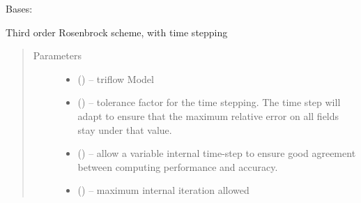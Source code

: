 \documentclass[letterpaper,10pt,english]{sphinxmanual}
\begin{document}
\begin{fulllineitems}
\begin{quote}
\begin{description}
\begin{itemize}
\end{itemize}

\end{description}\end{quote}

\end{fulllineitems}


\begin{fulllineitems}
\label{\detokenize{triflow.plugins:triflow.plugins.schemes.ROS3PRw}}
Bases: {\hyperref[\detokenize{triflow.plugins:triflow.plugins.schemes.ROW_general}]{}}

Third order Rosenbrock scheme, with time stepping
\begin{quote}\begin{description}
\item[{Parameters}] \leavevmode\begin{itemize}
\item {} 
 () -- triflow Model

\item {} 
 (\sphinxstyleliteralemphasis{, }\sphinxstyleliteralemphasis{, }) -- tolerance factor for the time stepping. The time step will adapt to ensure that the maximum relative error on all fields stay under that value.

\item {} 
 (\sphinxstyleliteralemphasis{, }\sphinxstyleliteralemphasis{, }) -- allow a variable internal time-step to ensure good agreement between computing performance and accuracy.

\item {} 
 (\sphinxstyleliteralemphasis{, }\sphinxstyleliteralemphasis{, }) -- maximum internal iteration allowed


\end{itemize}
\end{description}
\end{quote}
\end{fulllineitems}
\end{document}

